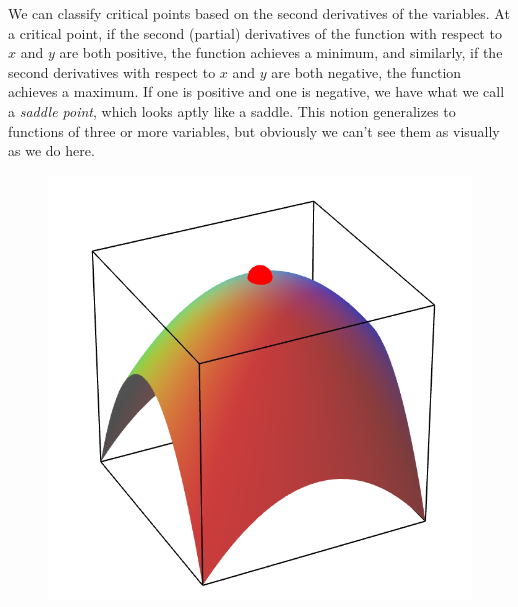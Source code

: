 We can classify critical points based on the second derivatives of the variables. At a critical point, if the second (partial) derivatives of the function with respect to $x$ and $y$ are both positive, the function achieves a minimum, and similarly, if the second derivatives with respect to $x$ and $y$ are both negative, the function achieves a maximum. If one is positive and one is negative, we have what we call a \textit{saddle point}, which looks aptly like a saddle. This notion generalizes to functions of three or more variables, but obviously we can't see them as visually as we do here. 
\begin{figure}[h!]
\centering
\begin{minipage}{0.3\textwidth}
\centering
\includegraphics[scale=0.2]{images/math/multivar/localmax.png}
\end{minipage}
\begin{minipage}{0.3\textwidth}
\centering

\end{minipage}
\end{figure}
